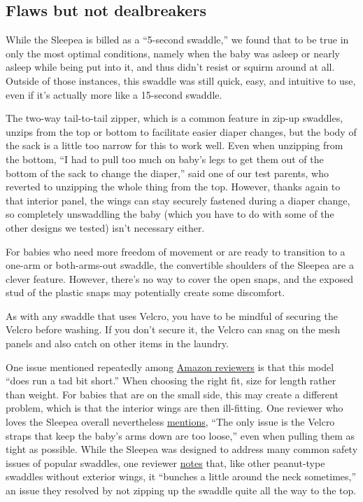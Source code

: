 \hypertarget{flaws-but-not-dealbreakers}{%
\subsection{Flaws but not
dealbreakers}\label{flaws-but-not-dealbreakers}}

While the Sleepea is billed as a ``5-second swaddle,'' we found that to
be true in only the most optimal conditions, namely when the baby was
asleep or nearly asleep while being put into it, and thus didn't resist
or squirm around at all. Outside of those instances, this swaddle was
still quick, easy, and intuitive to use, even if it's actually more like
a 15-second swaddle.

The two-way tail-to-tail zipper, which is a common feature in zip-up
swaddles, unzips from the top or bottom to facilitate easier diaper
changes, but the body of the sack is a little too narrow for this to
work well. Even when unzipping from the bottom, ``I had to pull too much
on baby's legs to get them out of the bottom of the sack to change the
diaper,'' said one of our test parents, who reverted to unzipping the
whole thing from the top. However, thanks again to that interior panel,
the wings can stay securely fastened during a diaper change, so
completely unswaddling the baby (which you have to do with some of the
other designs we tested) isn't necessary either.

For babies who need more freedom of movement or are ready to transition
to a one-arm or both-arms-out swaddle, the convertible shoulders of the
Sleepea are a clever feature. However, there's no way to cover the open
snaps, and the exposed stud of the plastic snaps may potentially create
some discomfort.

As with any swaddle that uses Velcro, you have to be mindful of securing
the Velcro before washing. If you don't secure it, the Velcro can snag
on the mesh panels and also catch on other items in the laundry.

One issue mentioned repeatedly among
\href{https://www.amazon.com/gp/customer-reviews/R1EYW1ZD70SZ6L?tag=thewire06-20\&linkCode=xm2\&ascsubtag=YT78495}{Amazon
reviewers} is that this model ``does run a tad bit short.'' When
choosing the right fit, size for length rather than weight. For babies
that are on the small side, this may create a different problem, which
is that the interior wings are then ill-fitting. One reviewer who loves
the Sleepea overall nevertheless
\href{https://www.amazon.com/gp/customer-reviews/R1ELAG1SSXCDC3/ref=cm_cr_getr_d_rvw_ttl?ie=UTF8\&ASIN=B079HH8CD1?tag=thewire06-20\&linkCode=xm2\&ascsubtag=YT78495}{mentions},
``The only issue is the Velcro straps that keep the baby's arms down are
too loose,'' even when pulling them as tight as possible. While the
Sleepea was designed to address many common safety issues of popular
swaddles, one reviewer
\href{https://www.amazon.com/gp/customer-reviews/R34YWZN7FCU88Q?tag=thewire06-20\&linkCode=xm2\&ascsubtag=YT78495}{notes}
that, like other peanut-type swaddles without exterior wings, it
``bunches a little around the neck sometimes,'' an issue they resolved
by not zipping up the swaddle quite all the way to the top.

